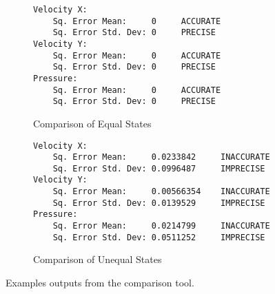 \begin{figure}[ht]
    \centering
    \begin{center}
\begin{subfigure}{0.4\textwidth}\begin{lstlisting}
Velocity X:
    Sq. Error Mean:     0     ACCURATE
    Sq. Error Std. Dev: 0     PRECISE
Velocity Y:
    Sq. Error Mean:     0     ACCURATE
    Sq. Error Std. Dev: 0     PRECISE
Pressure:
    Sq. Error Mean:     0     ACCURATE
    Sq. Error Std. Dev: 0     PRECISE\end{lstlisting}%
    \caption{Comparison of Equal States}%
\end{subfigure}%
\hspace{0.02\textwidth}
\begin{subfigure}{0.5\textwidth}\begin{lstlisting}[]
Velocity X:
    Sq. Error Mean:     0.0233842     INACCURATE
    Sq. Error Std. Dev: 0.0996487     IMPRECISE
Velocity Y:
    Sq. Error Mean:     0.00566354    INACCURATE
    Sq. Error Std. Dev: 0.0139529     IMPRECISE
Pressure:
    Sq. Error Mean:     0.0214799     INACCURATE
    Sq. Error Std. Dev: 0.0511252     IMPRECISE\end{lstlisting}%
\caption{Comparison of Unequal States}%
\end{subfigure}
\end{center}
    
    
    \caption{Examples outputs from the comparison tool.}
    \label{fig:example_comparisons}
\end{figure}